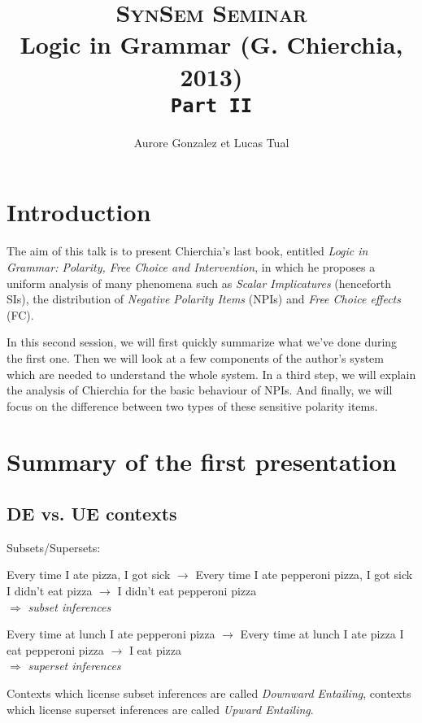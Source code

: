 \documentclass[a4paper,11pt]{article}
\title{\textsc{SynSem Seminar}\\Logic in Grammar (G. Chierchia, 2013)\\\vspace{0.3cm}\texttt{Part II}}
\author{Aurore Gonzalez et Lucas Tual}
\affil{LLING - University of Nantes}
\newcommand{\exs}[2][]{\begin{exe}\ex #1 \begin{xlist}#2\end{xlist}\end{exe}}
\begin{document}
\maketitle
\tableofcontents


\section*{Introduction}
The aim of this talk is to present Chierchia's last book, entitled \emph{Logic in Grammar: Polarity, Free Choice and Intervention}, in which he proposes a uniform analysis of many phenomena such as \emph{Scalar Implicatures} (henceforth SIs), the distribution of \emph{Negative Polarity Items} (NPIs) and \emph{Free Choice effects} (FC).

In this second session, we will first quickly summarize what we've done during the first one. Then we will look at a few components of the author's system which are needed to understand the whole system. In a third step, we will explain the analysis of Chierchia for the basic behaviour of NPIs. And finally, we will focus on the difference between two types of these sensitive polarity items.

\section{Summary of the first presentation}
\subsection{DE vs. UE contexts}
  \exs[\label{subset}Subsets/Supersets:]{
    \ex Every time I ate pizza, I got sick $\rightarrow$ Every time I ate pepperoni pizza, I got sick
    \ex\label{negsent} I didn't eat pizza $\rightarrow$ I didn't eat pepperoni pizza \\ $\Rightarrow$ \emph{subset inferences}
  }
  \exs[\label{supset}]{
    \ex Every time at lunch I ate pepperoni pizza $\rightarrow$ Every time at lunch I ate pizza
    \ex\label{possent} I eat pepperoni pizza $\rightarrow$ I eat pizza \\ $\Rightarrow$ \emph{superset inferences}
  }
Contexts which license subset inferences are called \emph{Downward Entailing}, contexts which license superset inferences are called \emph{Upward Entailing}.
\end{document}
